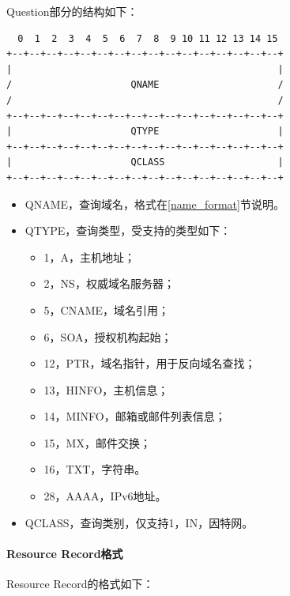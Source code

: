 \documentclass[lang=cn,11pt,a4paper,cite=authornum]{paper}
\begin{document}
Question部分的结构如下：

\begin{code}
\begin{verbatim}
  0  1  2  3  4  5  6  7  8  9 10 11 12 13 14 15
+--+--+--+--+--+--+--+--+--+--+--+--+--+--+--+--+
|                                               |
/                     QNAME                     /
/                                               /
+--+--+--+--+--+--+--+--+--+--+--+--+--+--+--+--+
|                     QTYPE                     |
+--+--+--+--+--+--+--+--+--+--+--+--+--+--+--+--+
|                     QCLASS                    |
+--+--+--+--+--+--+--+--+--+--+--+--+--+--+--+--+
\end{verbatim}
\end{code}

\begin{itemize}
    \item QNAME，查询域名，格式在\ref{name_format}节说明。
    \item QTYPE，查询类型，受支持的类型如下：
        \begin{itemize}
            \item 1，A，主机地址；
            \item 2，NS，权威域名服务器；
            \item 5，CNAME，域名引用；
            \item 6，SOA，授权机构起始；
            \item 12，PTR，域名指针，用于反向域名查找；
            \item 13，HINFO，主机信息；
            \item 14，MINFO，邮箱或邮件列表信息；
            \item 15，MX，邮件交换；
            \item 16，TXT，字符串。
            \item 28，AAAA，IPv6地址。
        \end{itemize}
    \item QCLASS，查询类别，仅支持1，IN，因特网。
\end{itemize}

\paragraph{Resource Record格式}

Resource Record的格式如下：
\end{document}
